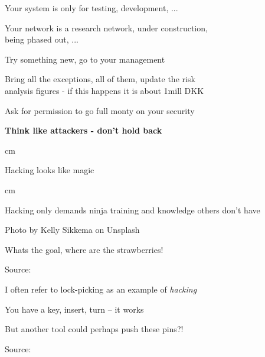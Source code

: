 \documentclass[Screen16to9,17pt]{foils}
\begin{document}


Your system is only for testing, development, ...

Your network is a research network, under construction, \\
being phased out, ...

Try something new, go to your management

Bring all the exceptions, all of them, update the risk \\
analysis figures - if this happens it is about 1mill DKK

Ask for permission to go full monty on your security

{\bf Think like attackers - don't hold back}






 cm

Hacking looks like magic




 cm
\centerline{Hacking only demands ninja training and knowledge others don't have}

\slide{}


\hfill {\footnotesize Photo by Kelly Sikkema on Unsplash}

\centerline{Whats the goal, where are the strawberries!}



Source:

\begin{list2}
\item I often refer to lock-picking as an example of \emph{hacking}
\item You have a key, insert, turn -- it works
\item But another tool could perhaps push these pins?!
\end{list2}


Source:
\end{document}

